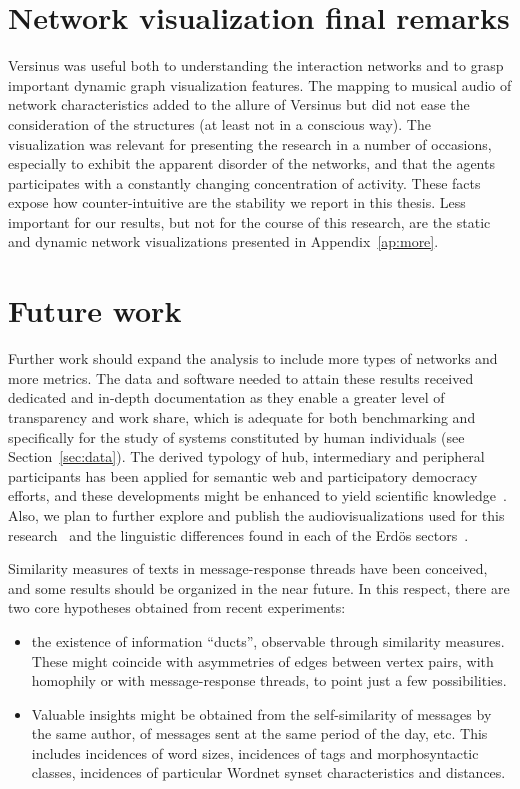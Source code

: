 \section{Network visualization final remarks}
Versinus was useful both to understanding the interaction networks and to
grasp important dynamic graph visualization features.
The mapping to musical audio of network characteristics added to
the allure of Versinus but did not ease the consideration of the structures
(at least not in a conscious way).
The visualization was relevant for presenting the research in a number of occasions,
especially to exhibit the apparent disorder of the networks,
and that the agents participates with a constantly changing concentration of activity.
These facts expose how counter-intuitive are the stability we report in this thesis.
Less important for our results, but not for the course of this research,
are the static and dynamic network visualizations presented in Appendix~\ref{ap:more}.

\section{Future work}\label{sec:fw}

Further work should expand the analysis to include
more types of networks and more metrics.
The data and software needed to attain these results
received dedicated and in-depth
documentation as they enable a greater level of transparency
and work share,
which is adequate for both benchmarking
and specifically for the study of systems constituted
by human individuals (see Section~\ref{sec:data}).
The derived typology of hub, intermediary and peripheral participants
has been applied for semantic web and participatory democracy efforts,
and these developments might be enhanced to yield scientific knowledge~\cite{pnud4,opa,losd}.
Also, we plan to further explore and publish the audiovisualizations
used for this research~\cite{versinus,animacoes} and
the linguistic differences found in each of the Erd\"os sectors~\cite{rcText}.

Similarity measures of texts in message-response threads have been conceived, 
and some results should be organized in the near future.
In this respect, there are two core hypotheses obtained from recent experiments:
\begin{itemize}
\item the existence of information ``ducts'', observable through similarity measures.
These might coincide with asymmetries of edges between vertex pairs,
with homophily or with message-response threads, to point just a few possibilities.
\item Valuable insights might be obtained from the self-similarity of messages by the same author,
of messages sent at the same period of the day, etc.
This includes incidences of word sizes, incidences of tags and morphosyntactic classes,
incidences of particular Wordnet synset characteristics and distances.
\end{itemize}

